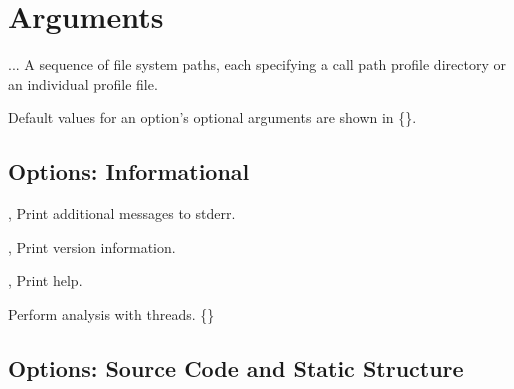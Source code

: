 \documentclass[english]{article}
\begin{document}
\section{Arguments}

\begin{Description}
\item[\Arg{measurements}...] A sequence of file system paths,
each specifying a call path profile directory or an individual profile file.
\end{Description}

Default values for an option's optional arguments are shown in \{\}.

\subsection{Options: Informational}

\begin{Description}

\item[\Opt{-v}, \Opt{--verbose}]
Print additional messages to stderr.

\item[\Opt{-V}, \Opt{--version}]
Print version information.

\item[\Opt{-h}, \Opt{--help}]
Print help.

\item[\OptArg{-j}{threads}]
Perform analysis with  threads.  \{<all available>\}

\end{Description}

\subsection{Options: Source Code and Static Structure}
\end{document}
